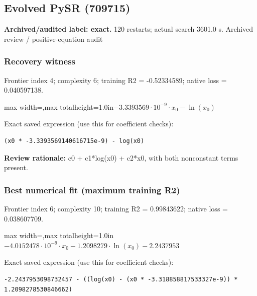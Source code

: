 \documentclass[10pt,letterpaper,landscape]{article}
\begin{document}
\begin{minipage}[t]{0.485\textwidth}
\subsection*{Evolved PySR (709715)}
\textbf{Archived/audited label: exact.} 120 restarts; actual search 3601.0 s.
{\small Archived review / positive-equation audit}
\subsubsection*{Recovery witness}
Frontier index 4; complexity 6; training R2 = -0.52334589; native loss = 0.040597138.
\begin{center}\begin{adjustbox}{max width=\linewidth,max totalheight=1.0in}$\displaystyle - 3.3393569 \cdot 10^{-9} \cdot x_{0} - \ln{\left(x_{0} \right)}$\end{adjustbox}\end{center}
{\scriptsize Exact saved expression (use this for coefficient checks):}
\begin{lstlisting}
(x0 * -3.3393569140616715e-9) - log(x0)
\end{lstlisting}
{\small\textbf{Review rationale:} c0 + c1*log(x0) + c2*x0, with both nonconstant terms present.}
\subsubsection*{Best numerical fit (maximum training R2)}
Frontier index 6; complexity 10; training R2 = 0.99843622; native loss = 0.038607709.
\begin{center}\begin{adjustbox}{max width=\linewidth,max totalheight=1.0in}$\displaystyle - 4.0152478 \cdot 10^{-9} \cdot x_{0} - 1.2098279 \cdot \ln{\left(x_{0} \right)} - 2.2437953$\end{adjustbox}\end{center}
{\scriptsize Exact saved expression (use this for coefficient checks):}
\begin{lstlisting}
-2.2437953098732457 - ((log(x0) - (x0 * -3.318858817533327e-9)) * 1.2098278530846662)
\end{lstlisting}
\end{minipage}
\clearpage{}\label{schechter-10002}
\end{document}
